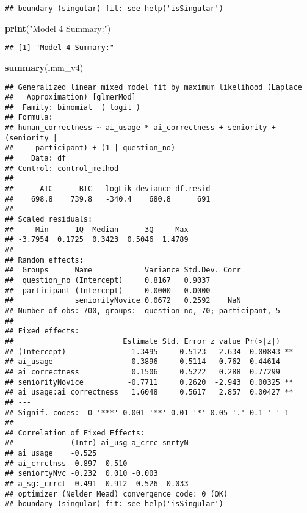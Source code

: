 \documentclass[
]{article}
\newenvironment{Shaded}{\begin{snugshade}}{\end{snugshade}}
\newcommand{\FunctionTok}[1]{\textcolor[rgb]{0.13,0.29,0.53}{\textbf{#1}}}
\newcommand{\NormalTok}[1]{#1}
\newcommand{\StringTok}[1]{\textcolor[rgb]{0.31,0.60,0.02}{#1}}
\begin{document}
\begin{verbatim}
## boundary (singular) fit: see help('isSingular')
\end{verbatim}

\begin{Shaded}
\begin{Highlighting}[]
\FunctionTok{print}\NormalTok{(}\StringTok{"Model 4 Summary:"}\NormalTok{)}
\end{Highlighting}
\end{Shaded}

\begin{verbatim}
## [1] "Model 4 Summary:"
\end{verbatim}

\begin{Shaded}
\begin{Highlighting}[]
\FunctionTok{summary}\NormalTok{(lmm\_v4)}
\end{Highlighting}
\end{Shaded}

\begin{verbatim}
## Generalized linear mixed model fit by maximum likelihood (Laplace
##   Approximation) [glmerMod]
##  Family: binomial  ( logit )
## Formula: 
## human_correctness ~ ai_usage * ai_correctness + seniority + (seniority |  
##     participant) + (1 | question_no)
##    Data: df
## Control: control_method
## 
##      AIC      BIC   logLik deviance df.resid 
##    698.8    739.8   -340.4    680.8      691 
## 
## Scaled residuals: 
##     Min      1Q  Median      3Q     Max 
## -3.7954  0.1725  0.3423  0.5046  1.4789 
## 
## Random effects:
##  Groups      Name            Variance Std.Dev. Corr
##  question_no (Intercept)     0.8167   0.9037       
##  participant (Intercept)     0.0000   0.0000       
##              seniorityNovice 0.0672   0.2592    NaN
## Number of obs: 700, groups:  question_no, 70; participant, 5
## 
## Fixed effects:
##                         Estimate Std. Error z value Pr(>|z|)   
## (Intercept)               1.3495     0.5123   2.634  0.00843 **
## ai_usage                 -0.3896     0.5114  -0.762  0.44614   
## ai_correctness            0.1506     0.5222   0.288  0.77299   
## seniorityNovice          -0.7711     0.2620  -2.943  0.00325 **
## ai_usage:ai_correctness   1.6048     0.5617   2.857  0.00427 **
## ---
## Signif. codes:  0 '***' 0.001 '**' 0.01 '*' 0.05 '.' 0.1 ' ' 1
## 
## Correlation of Fixed Effects:
##             (Intr) ai_usg a_crrc snrtyN
## ai_usage    -0.525                     
## ai_crrctnss -0.897  0.510              
## seniortyNvc -0.232  0.010 -0.003       
## a_sg:_crrct  0.491 -0.912 -0.526 -0.033
## optimizer (Nelder_Mead) convergence code: 0 (OK)
## boundary (singular) fit: see help('isSingular')
\end{verbatim}
\end{document}
